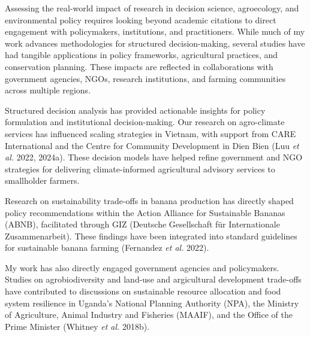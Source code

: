 \documentclass[
]{article}
\begin{document}
Assessing the real-world impact of research in decision science,
agroecology, and environmental policy requires looking beyond academic
citations to direct engagement with policymakers, institutions, and
practitioners. While much of my work advances methodologies for
structured decision-making, several studies have had tangible
applications in policy frameworks, agricultural practices, and
conservation planning. These impacts are reflected in collaborations
with government agencies, NGOs, research institutions, and farming
communities across multiple regions.

Structured decision analysis has provided actionable insights for policy
formulation and institutional decision-making. Our research on
agro-climate services has influenced scaling strategies in Vietnam, with
support from CARE International and the Centre for Community Development
in Dien Bien (Luu \emph{et al.} 2022, 2024a). These decision models have
helped refine government and NGO strategies for delivering
climate-informed agricultural advisory services to smallholder farmers.

Research on sustainability trade-offs in banana production has directly
shaped policy recommendations within the Action Alliance for Sustainable
Bananas (ABNB), facilitated through GIZ (Deutsche Gesellschaft für
Internationale Zusammenarbeit). These findings have been integrated into
standard guidelines for sustainable banana farming (Fernandez \emph{et
al.} 2022).

My work has also directly engaged government agencies and policymakers.
Studies on agrobiodiversity and land-use and argicultural development
trade-offs have contributed to discussions on sustainable resource
allocation and food system resilience in Uganda's National Planning
Authority (NPA), the Ministry of Agriculture, Animal Industry and
Fisheries (MAAIF), and the Office of the Prime Minister (Whitney
\emph{et al.} 2018b).
\end{document}
